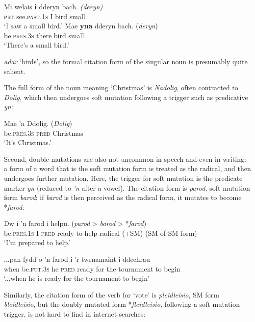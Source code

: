 \documentclass[output=paper,colorlinks,citecolor=brown]{langscibook}
\begin{document}
\ea
\ea\label{ex:mt:tallerman:45a}
\gll Mi welais \textbf{i} dderyn bach.   \textit{(deryn)} \\
\textsc{prt} see.\textsc{past.1s} I bird small \\
\glt ‘I saw a small bird.’
\ex\label{ex:mt:tallerman:45b}
\gll Mae \textbf{yna} dderyn bach.   (\textit{deryn}) \\
be.\textsc{pres.3s} there bird small \\
\glt ‘There’s a small bird.’
\z
\z

 {\textit{adar}}{ ‘birds’, so the formal citation form of the singular noun is presumably quite salient.}

The full form of the noun meaning ‘Christmas’ is \textit{Nadolig}, often contracted to \textit{Dolig,} {which then undergoes soft mutation following a trigger such as predicative} {\textit{yn}}{:}

\ea\label{ex:mt:tallerman:46}
\gll Mae ’n Ddolig.    (\textit{Dolig}) \\
be.\textsc{pres.3s} \textsc{pred} Christmas\\
\glt ‘It’s Christmas.’
\z

{Second, double mutations are also not uncommon in speech and even in writing: a form of a word that is the soft mutation form is treated as the radical, and then undergoes further mutation. Here, the trigger for soft mutation is the predicate marker} {\textit{yn} }{(reduced to} {\textit{’n}}{ after a vowel). The citation form is} {\textit{parod,} }{soft mutation form} {\textit{barod}}{; if} {\textit{barod} }{is then perceived as the radical form, it mutates to become *}{\textit{farod}}{:}

\ea\label{ex:mt:tallerman:47}
\gll Dw i ’n farod i helpu. ({\langscicheckmark}\textit{parod}{ >} {\langscicheckmark}\textit{barod} > {*\textit{farod}})\\
be.\textsc{pres.1s} I \textsc{pred} ready to help radical (+SM) {} {(SM of SM form)}   \\
\glt ‘I’m prepared to help.’
\z

\ea\label{ex:mt:tallerman:48}
\gll ...pan fydd o ’n farod i {}'r twrnamaint i ddechrau\\
when be.\textsc{fut.3s} he  \textsc{pred} ready for the tournament to begin\\
\glt ‘...when he is ready for the tournament to begin’
\z

{Similarly, the citation form of the verb for ‘vote’ is} {\textit{pleidleisio}}{, SM form} {\textit{bleidleisio}}{, but the doubly mutated form *}{\textit{fleidleisio,}}{ following a soft mutation trigger, is not hard to find in internet searches:}
\end{document}
